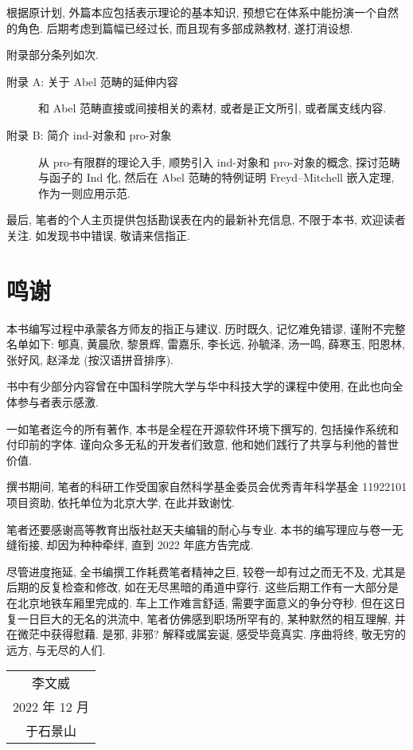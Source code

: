 根据原计划, 外篇本应包括表示理论的基本知识, 预想它在体系中能扮演一个自然的角色. 后期考虑到篇幅已经过长, 而且现有多部成熟教材, 遂打消设想.

附录部分条列如次.
\begin{description}
	\item[附录 A: 关于 Abel 范畴的延伸内容] 和 Abel 范畴直接或间接相关的素材, 或者是正文所引, 或者属支线内容.
	\item[附录 B: 简介 ind-对象和 pro-对象] 从 pro-有限群的理论入手, 顺势引入 ind-对象和 pro-对象的概念, 探讨范畴与函子的 Ind 化, 然后在 Abel 范畴的特例证明 Freyd--Mitchell 嵌入定理, 作为一则应用示范.
\end{description}

最后, 笔者的个人主页提供包括勘误表在内的最新补充信息, 不限于本书, 欢迎读者关注. 如发现书中错误, 敬请来信指正.

\section*{鸣谢}
本书编写过程中承蒙各方师友的指正与建议. 历时既久, 记忆难免错谬, 谨附不完整名单如下: 郇真, 黄晨欣, 黎景辉, 雷嘉乐, 李长远, 孙毓泽, 汤一鸣, 薛寒玉, 阳恩林, 张好风, 赵泽龙 (按汉语拼音排序).

书中有少部分内容曾在中国科学院大学与华中科技大学的课程中使用, 在此也向全体参与者表示感激.

一如笔者迄今的所有著作, 本书是全程在开源软件环境下撰写的, 包括操作系统和付印前的字体. 谨向众多无私的开发者们致意, 他和她们践行了共享与利他的普世价值.

撰书期间, 笔者的科研工作受国家自然科学基金委员会优秀青年科学基金 11922101 项目资助, 依托单位为北京大学, 在此并致谢忱.

笔者还要感谢高等教育出版社赵天夫编辑的耐心与专业. 本书的编写理应与卷一无缝衔接, 却因为种种牵绊, 直到 2022 年底方告完成.

尽管进度拖延, 全书编撰工作耗费笔者精神之巨, 较卷一却有过之而无不及, 尤其是后期的反复检查和修改, 如在无尽黑暗的甬道中穿行. 这些后期工作有一大部分是在北京地铁车厢里完成的. 车上工作难言舒适, 需要字面意义的争分夺秒. 但在这日复一日巨大的无名的洪流中, 笔者仿佛感到职场所罕有的, 某种默然的相互理解, 并在微茫中获得慰藉. 是邪, 非邪? 解释或属妄诞, 感受毕竟真实. 序曲将终, 敬无穷的远方, 与无尽的人们.

\vspace{1em}
\begin{flushright}\begin{minipage}{0.3 \textwidth}
	\begin{tabular}{c}
		{\fangsong 李文威} \\
		2022 年 12 月 \\
		于石景山
	\end{tabular}
\end{minipage}\end{flushright}

